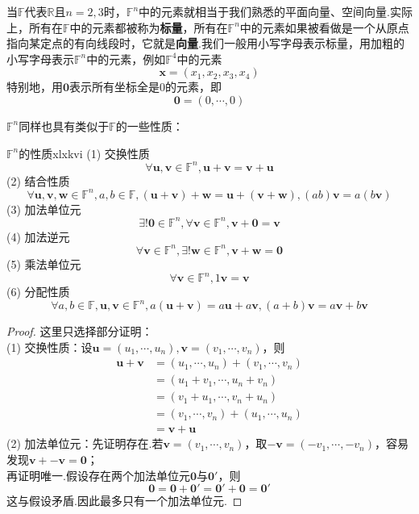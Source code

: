 \documentclass[lang=cn, zihao=5]{elegantbook}
\newcommand{\R}{\mathbb{R}}
\newcommand{\F}{\mathbb{F}}
\begin{document}
当$\F$代表$\R$且$n=2,3$时，$\F ^{n}$中的元素就相当于我们熟悉的平面向量、空间向量.实际上，所有在$\F$中的元素都被称为\textbf{标量}，所有在$\F ^{n}$中的元素如果被看做是一个从原点指向某定点的有向线段时，它就是\textbf{向量}.我们一般用小写字母表示标量，用加粗的小写字母表示$\F ^{n}$中的元素，例如$\F ^{4}$中的元素$$\boldsymbol{x} = (x_1,x_2,x_3,x_4)$$
特别地，用$\boldsymbol{0}$表示所有坐标全是$0$的元素，即$$\boldsymbol{0} = (0, \cdots , 0)$$

$\F ^{n}$同样也具有类似于$\F$的一些性质：

\begin{proposition}{$\F ^{n}$的性质}{xlxkvi}
	(1) 交换性质$$\forall \boldsymbol{u},\boldsymbol{v} \in \F ^{n} , \boldsymbol{u} + \boldsymbol{v} = \boldsymbol{v} + \boldsymbol{u}$$
	(2) 结合性质$$\forall \boldsymbol{u},\boldsymbol{v},\boldsymbol{w} \in \F ^{n}, a,b \in \F, (\boldsymbol{u} + \boldsymbol{v}) + \boldsymbol{w} = \boldsymbol{u} + (\boldsymbol{v} + \boldsymbol{w}) , (ab) \boldsymbol{v} = a (b\boldsymbol{v})$$
	(3) 加法单位元$$\exists ! \boldsymbol{0} \in \F ^{n}, \forall \boldsymbol{v} \in \F ^{n} , \boldsymbol{v} + \boldsymbol{0} = \boldsymbol{v}$$
	(4) 加法逆元$$\forall \boldsymbol{v} \in \F ^{n} , \exists ! \boldsymbol{w} \in \F ^{n} , \boldsymbol{v} + \boldsymbol{w} = \boldsymbol{0}$$
	(5) 乘法单位元$$\forall \boldsymbol{v} \in \F ^{n} , 1\boldsymbol{v} = \boldsymbol{v}$$
	(6) 分配性质$$\forall a,b \in \F , \boldsymbol{u},\boldsymbol{v} \in \F ^{n} , a (\boldsymbol{u} + \boldsymbol{v}) = a\boldsymbol{u} + a\boldsymbol{v} , (a+b)\boldsymbol{v} = a\boldsymbol{v}+b\boldsymbol{v}$$
\end{proposition}
\begin{proof}
	这里只选择部分证明：\\
	(1) 交换性质：设$\boldsymbol{u} = (u_1, \cdots ,u_n),\boldsymbol{v} = (v_1, \cdots ,v_n)$，则
	\begin{align*}
		\boldsymbol{u} + \boldsymbol{v} &= (u_1, \cdots ,u_n) + (v_1, \cdots ,v_n) \\
		&= (u_1+v_1, \cdots ,u_n+v_n) \\
		&= (v_1+u_1, \cdots ,v_n+u_n) \\
		&= (v_1, \cdots ,v_n) + (u_1, \cdots ,u_n) \\
		&= \boldsymbol{v} + \boldsymbol{u}
	\end{align*}
	(2) 加法单位元：先证明存在.若$\boldsymbol{v} = (v_1, \cdots ,v_n)$，取$\boldsymbol{-v} = (-v_1, \cdots ,-v_n)$，容易发现$\boldsymbol{v} + \boldsymbol{-v} = \boldsymbol{0}$； \\
	再证明唯一.假设存在两个加法单位元$\boldsymbol{0}$与$\boldsymbol{0'}$，则$$\boldsymbol{0} = \boldsymbol{0} + \boldsymbol{0'} = \boldsymbol{0'} + \boldsymbol{0} = \boldsymbol{0'}$$
	这与假设矛盾.因此最多只有一个加法单位元.
\end{proof}
\end{document}
